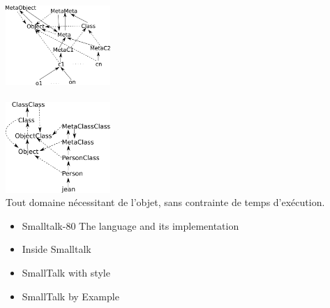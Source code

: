 \\ \\
	\includegraphics[width=150px]{Images/02_hierarchie2.pdf}\\ \\
	\includegraphics[width=150px]{Images/03_hierarchie3.pdf}\\

 Tout domaine nécessitant de l'objet, sans contrainte de temps d'exécution.\\

\begin{itemize}
	\item Smalltalk-80 The language and its implementation
	\item Inside Smalltalk
	\item SmallTalk with style
	\item SmallTalk by Example
\end{itemize}
